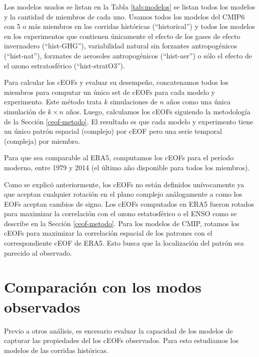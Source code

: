\documentclass[12pt,oneside,a4paper]{reedthesis}
\begin{document}
Los modelos usados se listan en la Tabla \ref{tab:modelos} se listan todos los modelos y la cantidad de miembros de cada uno.
Usamos todos los modelos del CMIP6 con 5 o más miembros en las corridas históricas (``historical'') y todos los modelos en los experimentos que contienen únicamente el efecto de los gases de efecto invernadero (``hist-GHG''), variabilidad natural sin forzantes antropogénicos (``hist-nat''), forznates de aerosoles antropogénicos (``hist-aer'') o sólo el efecto de el ozono estratosférico (``hist-stratO3'').

Para calcular los cEOFs y evaluar su desempeño, concatenamos todos los miembros para computar un único set de cEOFs para cada modelo y experimento.
Este método trata \(k\) simulaciones de \(n\) años como una única simulación de \(k\times n\) años.
Luego, calculamos los cEOFs siguiendo la metodología de la Sección \ref{ceof-metodo}.
El resultado es que cada modelo y experimento tiene un único patrón espacial (complejo) por cEOF pero una serie temporal (compleja) por miembro.

Para que sea comparable al ERA5, computamos los cEOFs para el período moderno, entre 1979 y 2014 (el último año disponible para todos los miembros).

Como se explicó anteriormente, los cEOFs no están definidos unívocamente ya que aceptan cualquier rotación en el plano complejo análogamente a como los EOFs aceptan cambios de signo.
Los cEOFs computados en ERA5 fueron rotados para maximizar la correlación con el ozono estatosférico o el ENSO como se describe en la Sección \ref{ceof-metodo}.
Para los modelos de CMIP, rotamos los cEOFs para maximizar la correlación espacial de los patrones con el correspondiente cEOF de ERA5.
Esto busca que la localización del patrón sea parecido al observado.

\hypertarget{comparaciuxf3n-con-los-modos-observados}{%
\section{Comparación con los modos observados}\label{comparaciuxf3n-con-los-modos-observados}}

Previo a otros análisis, es encesario evaluar la capacidad de los modelos de capturar las propiedades del los cEOFs observados.
Para esto estudiamos los modelos de las corridas históricas.
\end{document}
